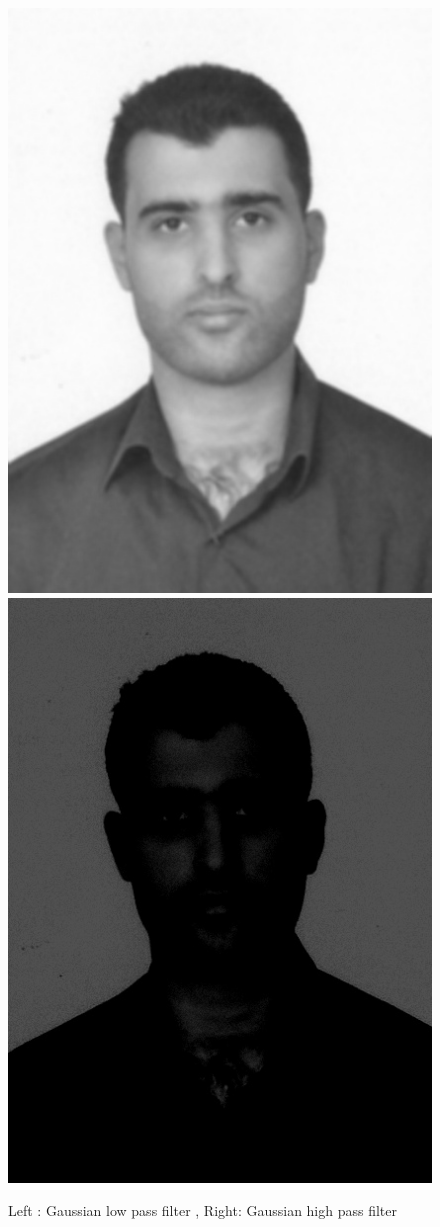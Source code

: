 \documentclass{article}
\begin{document}
\begin{figure}[H]
	\includegraphics[scale=0.5]{mypic_GLPF.jpg}
	\includegraphics[scale=0.5]{mypic_GHPF.jpg}
	\caption{Left : Gaussian low pass filter , Right: Gaussian high pass filter}
\end{figure}
\end{document}

